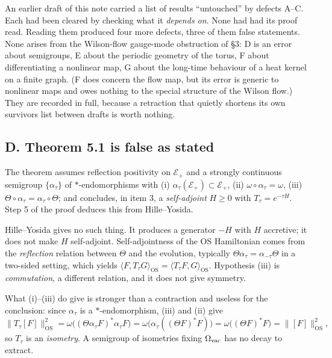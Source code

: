 \documentclass[11pt]{article}
\begin{document}
An earlier draft of this note carried a list of results ``untouched'' by defects
A--C. Each had been cleared by checking what it \emph{depends on}. None had had its
proof read. Reading them produced four more defects, three of them false statements.
None arises from the Wilson-flow gauge-mode obstruction of \S3: D is an error about
semigroups, E about the periodic geometry of the torus, F about differentiating a
nonlinear map, G about the long-time behaviour of a heat kernel on a finite graph.
(F does concern the flow map, but its error is generic to nonlinear maps and owes
nothing to the special structure of the Wilson flow.) They are recorded in full,
because a retraction that quietly shortens its own survivors list between drafts is
worth nothing.

\subsection{D. Theorem 5.1 is false as stated}

The theorem assumes reflection positivity on $\mathcal E_+$ and a strongly continuous
semigroup $\{\alpha_\tau\}$ of $*$-endomorphisms with (i)
$\alpha_\tau(\mathcal E_+)\subset\mathcal E_+$, (ii) $\omega\circ\alpha_\tau=\omega$,
(iii) $\Theta\circ\alpha_\tau=\alpha_\tau\circ\Theta$; and concludes, in item 3, a
\emph{self-adjoint} $H\ge 0$ with $T_\tau=e^{-\tau H}$. Step 5 of the proof deduces
this from Hille--Yosida.

Hille--Yosida gives no such thing. It produces a generator $-H$ with $H$ accretive; it
does not make $H$ self-adjoint. Self-adjointness of the OS Hamiltonian comes from the
\emph{reflection} relation between $\Theta$ and the evolution, typically
$\Theta\alpha_\tau=\alpha_{-\tau}\Theta$ in a two-sided setting, which yields
$\langle F,T_\tau G\rangle_{\mathrm{OS}}=\langle T_\tau F,G\rangle_{\mathrm{OS}}$.
Hypothesis (iii) is \emph{commutation}, a different relation, and it does not give
symmetry.

What (i)--(iii) do give is stronger than a contraction and useless for the conclusion:
since $\alpha_\tau$ is a $*$-endomorphism, (iii) and (ii) give
\[
\|T_\tau[F]\|^2_{\mathrm{OS}}
=\omega\bigl((\Theta\alpha_\tau F)^*\alpha_\tau F\bigr)
=\omega\bigl(\alpha_\tau((\Theta F)^*F)\bigr)
=\omega\bigl((\Theta F)^*F\bigr)=\|[F]\|^2_{\mathrm{OS}},
\]
so $T_\tau$ is an \emph{isometry}. A semigroup of isometries fixing $\Omega_{\rm vac}$
has no decay to extract.
\end{document}
